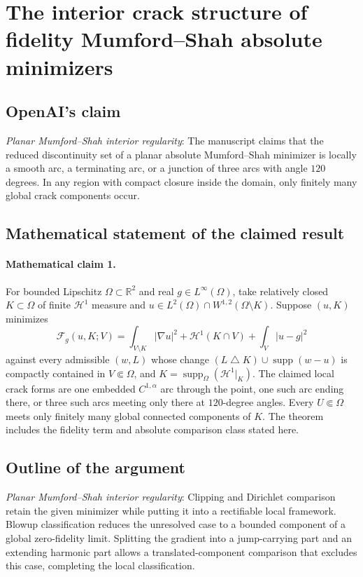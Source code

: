 \documentclass[11pt]{article}
\begin{document}
\section*{The interior crack structure of fidelity Mumford–Shah absolute minimizers}

\subsection{OpenAI's claim}
\textit{Planar Mumford--Shah interior regularity}: The manuscript claims that the reduced discontinuity set of a planar absolute Mumford--Shah minimizer is locally a smooth arc, a terminating arc, or a junction of three arcs with angle $120$ degrees. In any region with compact closure inside the domain, only finitely many global crack components occur.

\subsection{Mathematical statement of the claimed result}
\paragraph{Mathematical claim 1.} For bounded Lipschitz $\Omega\subset\mathbb R^2$ and real $g\in L^\infty(\Omega)$, take relatively closed $K\subset\Omega$ of finite $\mathcal H^1$ measure and $u\in L^2(\Omega)\cap W^{1,2}(\Omega\setminus K)$. Suppose $(u,K)$ minimizes \[\mathcal F_g(u,K;V)=\int_{V\setminus K}|\nabla u|^2+\mathcal H^1(K\cap V)+\int_V|u-g|^2\] against every admissible $(w,L)$ whose change $(L\mathbin{\triangle} K)\cup\operatorname{supp}(w-u)$ is compactly contained in $V\Subset\Omega$, and $K=\operatorname{supp}_\Omega(\mathcal H^1|_K)$. The claimed local crack forms are one embedded $C^{1,\alpha}$ arc through the point, one such arc ending there, or three such arcs meeting only there at $120$-degree angles. Every $U\Subset\Omega$ meets only finitely many global connected components of $K$. The theorem includes the fidelity term and absolute comparison class stated here.

\subsection{Outline of the argument}
\textit{Planar Mumford--Shah interior regularity}: Clipping and Dirichlet comparison retain the given minimizer while putting it into a rectifiable local framework. Blowup classification reduces the unresolved case to a bounded component of a global zero-fidelity limit. Splitting the gradient into a jump-carrying part and an extending harmonic part allows a translated-component comparison that excludes this case, completing the local classification.
\end{document}
